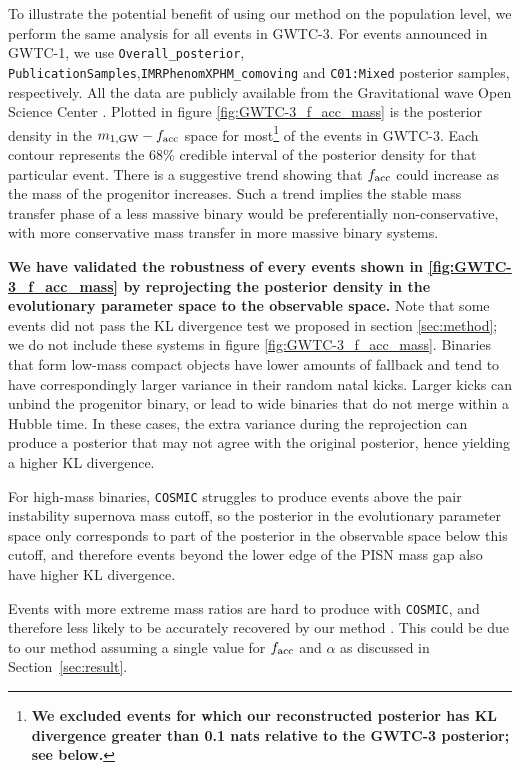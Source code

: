 \documentclass[linenumbers,twocolumn]{aastex631}
\begin{document}
To illustrate the potential benefit of using our method on the population level,
we perform the same analysis for all events in GWTC-3. For events announced in
GWTC-1, we use \texttt{Overall\_posterior},
\texttt{PublicationSamples},\texttt{IMRPhenomXPHM\_comoving} and
\texttt{C01:Mixed} posterior samples, respectively. All the data are publicly
available from the Gravitational wave Open Science Center
\citep{LIGOScientific:2019lzm}. Plotted in figure \ref{fig:GWTC-3_f_acc_mass} is
the posterior density in the $m_{1,{\rm GW}}-f_{\rm acc}$ space for
most\footnote{\textbf{We excluded events for which our reconstructed posterior has KL
divergence greater than 0.1 nats relative to the GWTC-3 posterior; see below.}}
of the events in GWTC-3. Each contour represents the $68\%$ credible interval of
the posterior density for that particular event. There is a suggestive trend
showing that $f_{\rm acc}$ could increase as the mass of the progenitor
increases. Such a trend implies the stable mass transfer phase of a less massive
binary would be preferentially non-conservative, with more conservative mass
transfer in more massive binary systems.

\textbf{We have validated the robustness of every events shown in
\ref{fig:GWTC-3_f_acc_mass} by reprojecting the posterior density in the
evolutionary parameter space to the observable space.} Note that some events did
not pass the KL divergence test we proposed in section \ref{sec:method}; we do
not include these systems in figure \ref{fig:GWTC-3_f_acc_mass}. Binaries that
form low-mass compact objects have lower amounts of fallback and tend to have
correspondingly larger variance in their random natal kicks. Larger kicks can
unbind the progenitor binary, or lead to wide binaries that do not merge within
a Hubble time.  In these cases, the extra variance during the reprojection can
produce a posterior that may not agree with the original posterior, hence
yielding a higher KL divergence.

For high-mass binaries, \texttt{COSMIC} struggles to produce events above the
pair instability supernova mass cutoff, so the posterior in the
evolutionary parameter space only corresponds to part of the posterior in the
observable space below this cutoff, and therefore events beyond the lower edge of the PISN mass
gap also have higher KL divergence.

Events with more extreme mass ratios are hard to produce with \texttt{COSMIC},
and therefore less likely to be accurately recovered by our method
\citep[e.g.][]{Zevin2020}. This could be due to our method assuming a single
value for $f_{\rm acc}$ and $\alpha$ as discussed in Section~\ref{sec:result}.
\end{document}
